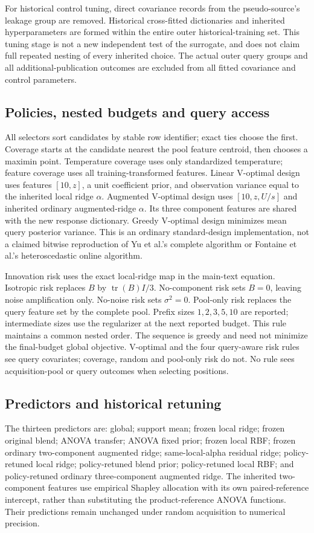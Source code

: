 \documentclass[11pt]{article}
\begin{document}
For historical control tuning, direct covariance records from the pseudo-source's leakage group are removed. Historical cross-fitted dictionaries and inherited hyperparameters are formed within the entire outer historical-training set. This tuning stage is not a new independent test of the surrogate, and does not claim full repeated nesting of every inherited choice. The actual outer query groups and all additional-publication outcomes are excluded from all fitted covariance and control parameters.

\subsection{Policies, nested budgets and query access}
All selectors sort candidates by stable row identifier; exact ties choose the first. Coverage starts at the candidate nearest the pool feature centroid, then chooses a maximin point. Temperature coverage uses only standardized temperature; feature coverage uses all training-transformed features. Linear V-optimal design uses features $[10,z]$, a unit coefficient prior, and observation variance equal to the inherited local ridge $\alpha$. Augmented V-optimal design uses $[10,z,U/s]$ and inherited ordinary augmented-ridge $\alpha$. Its three component features are shared with the new response dictionary. Greedy V-optimal design minimizes mean query posterior variance. This is an ordinary standard-design implementation, not a claimed bitwise reproduction of Yu et al.'s complete algorithm or Fontaine et al.'s heteroscedastic online algorithm.

Innovation risk uses the exact local-ridge map in the main-text equation. Isotropic risk replaces $B$ by $\operatorname{tr}(B)I/3$. No-component risk sets $B=0$, leaving noise amplification only. No-noise risk sets $\sigma^2=0$. Pool-only risk replaces the query feature set by the complete pool. Prefix sizes $1,2,3,5,10$ are reported; intermediate sizes use the regularizer at the next reported budget. This rule maintains a common nested order. The sequence is greedy and need not minimize the final-budget global objective. V-optimal and the four query-aware risk rules see query covariates; coverage, random and pool-only risk do not. No rule sees acquisition-pool or query outcomes when selecting positions.

\subsection{Predictors and historical retuning}
The thirteen predictors are: global; support mean; frozen local ridge; frozen original blend; ANOVA transfer; ANOVA fixed prior; frozen local RBF; frozen ordinary two-component augmented ridge; same-local-alpha residual ridge; policy-retuned local ridge; policy-retuned blend prior; policy-retuned local RBF; and policy-retuned ordinary three-component augmented ridge. The inherited two-component features use empirical Shapley allocation with its own paired-reference intercept, rather than substituting the product-reference ANOVA functions. Their predictions remain unchanged under random acquisition to numerical precision.
\end{document}
